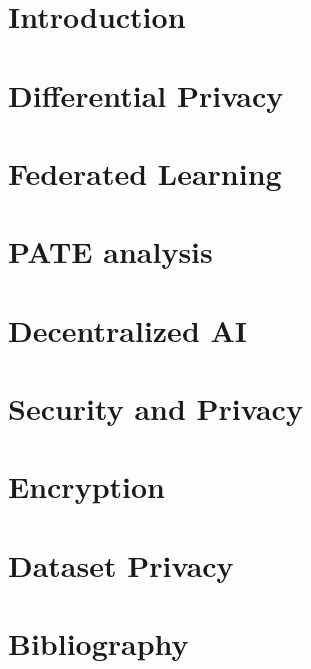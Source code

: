 \documentclass[11pt,fleqn]{book} %
\begin{document}
\chapter{Introduction}
\chapter{Differential Privacy}
\chapter{Federated Learning}
\chapter{PATE analysis}
\chapter{Decentralized AI}
\chapter{Security and Privacy}
\chapter{Encryption}
\chapter{Dataset Privacy}



\chapter*{Bibliography}

\end{document}
